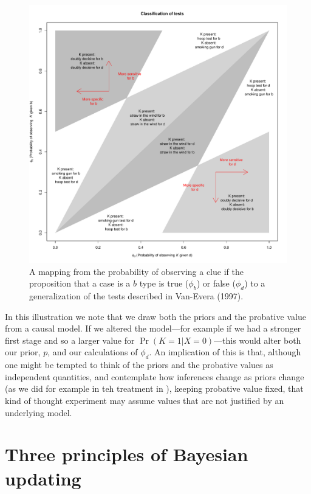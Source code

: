 \documentclass[
  12pt,
]{book}
\begin{document}
\begin{figure}
\centering
\includegraphics{ii_files/figure-latex/cluesinferences-1.pdf}
\caption{\label{fig:cluesinferences}\label{CluesInferences1} A mapping from the probability of observing a clue if the proposition that a case is a \(b\) type is true (\(\phi_b\)) or false (\(\phi_d\)) to a generalization of the tests described in Van-Evera (1997).}
\end{figure}

In this illustration we note that we draw both the priors and the probative value from a causal model. If we altered the model---for example if we had a stronger first stage and so a larger value for \(\Pr(K=1|X=0)\)---this would alter both our prior, \(p\), and our calculations of \(\phi_d\). An implication of this is that, although one might be tempted to think of the priors and the probative values as independent quantities, and contemplate how inferences change as priors change (as we did for example in teh treatment in \citet{humphreys2015mixing}), keeping probative value fixed, that kind of thought experiment may assume values that are not justified by an underlying model.

\hypertarget{three-principles-of-bayesian-updating}{%
\section{Three principles of Bayesian updating}\label{three-principles-of-bayesian-updating}}
\end{document}
